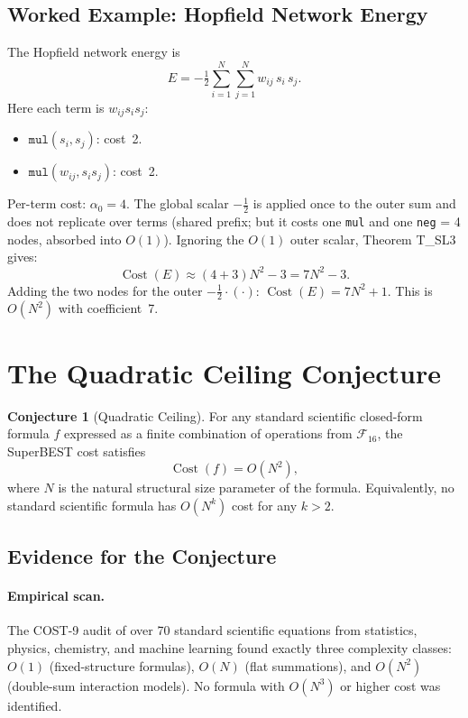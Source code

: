 \documentclass[12pt,a4paper]{article}
\theoremstyle{definition}
\newtheorem{conjecture}[theorem]{Conjecture}
\newcommand{\Cost}{\operatorname{Cost}}
\begin{document}
\subsection{Worked Example: Hopfield Network Energy}
\label{subsec:hopfield}

The Hopfield network energy is
\[
  E = -\tfrac{1}{2} \sum_{i=1}^{N} \sum_{j=1}^{N} w_{ij}\, s_i\, s_j.
\]
Here each term is $w_{ij} s_i s_j$:
\begin{itemize}
  \item $\texttt{mul}(s_i, s_j)$: cost~2.
  \item $\texttt{mul}(w_{ij}, s_i s_j)$: cost~2.
\end{itemize}
Per-term cost: $\alpha_0 = 4$.  The global scalar $-\tfrac{1}{2}$ is applied
once to the outer sum and does not replicate over terms (shared prefix; but it
costs one \texttt{mul} and one \texttt{neg} = 4 nodes, absorbed into $O(1)$).
Ignoring the $O(1)$ outer scalar, Theorem T\_SL3 gives:
\[
  \Cost(E) \approx (4 + 3)N^2 - 3 = 7N^2 - 3.
\]
Adding the two nodes for the outer $-\tfrac{1}{2}\cdot(\cdot)$:
$\Cost(E) = 7N^2 + 1$.  This is $O(N^2)$ with coefficient~7.

\section{The Quadratic Ceiling Conjecture}
\label{sec:conjecture}

\begin{conjecture}[Quadratic Ceiling]
\label{conj:QC}
For any standard scientific closed-form formula $f$ expressed as a finite
combination of operations from $\mathcal{F}_{16}$, the SuperBEST cost satisfies
\[
  \Cost(f) = O(N^2),
\]
where $N$ is the natural structural size parameter of the formula.
Equivalently, no standard scientific formula has $O(N^k)$ cost for any $k > 2$.
\end{conjecture}

\subsection{Evidence for the Conjecture}

\paragraph{Empirical scan.}
The COST-9 audit of over 70 standard scientific equations from statistics,
physics, chemistry, and machine learning found exactly three complexity classes:
$O(1)$ (fixed-structure formulas), $O(N)$ (flat summations), and $O(N^2)$
(double-sum interaction models).  No formula with $O(N^3)$ or higher cost was
identified.
\end{document}
